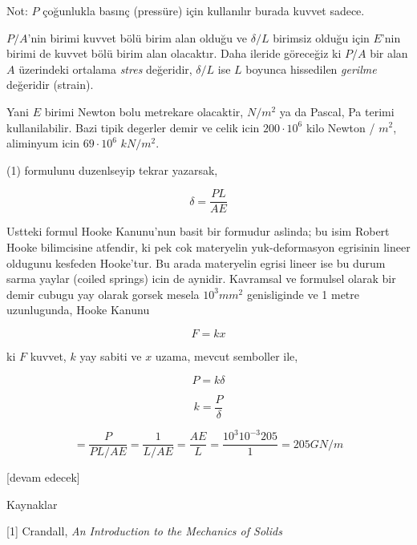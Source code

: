 \documentclass[12pt,fleqn]{article}\usepackage{../../common}
\begin{document}
Not: $P$ çoğunlukla basınç (pressüre) için kullanılır burada kuvvet sadece. 

$P/A$'nin birimi kuvvet bölü birim alan olduğu ve $\delta / L$ birimsiz olduğu
için $E$'nin birimi de kuvvet bölü birim alan olacaktır. Daha ileride göreceğiz
ki $P/A$ bir alan $A$ üzerindeki ortalama {\em stres} değeridir, $\delta / L$
ise $L$ boyunca hissedilen {\em gerilme} değeridir (strain).

Yani $E$ birimi Newton bolu metrekare olacaktir, $N/m^2$ ya da Pascal, Pa
terimi kullanilabilir. Bazi tipik degerler demir ve celik icin $200\cdot 10^6$
kilo Newton / $m^2$, aliminyum icin $69 \cdot 10^6$ $kN / m^2$.

(1) formulunu duzenlseyip tekrar yazarsak, 

$$
\delta = \frac{PL}{AE}
$$

Ustteki formul Hooke Kanunu'nun basit bir formudur aslinda; bu isim Robert Hooke
bilimcisine atfendir, ki pek cok materyelin yuk-deformasyon egrisinin lineer
oldugunu kesfeden Hooke'tur. Bu arada materyelin egrisi lineer ise bu durum
sarma yaylar (coiled springs) icin de aynidir. Kavramsal ve formulsel olarak
bir demir cubugu yay olarak gorsek mesela $10^3 mm^2$ genisliginde ve
1 metre uzunlugunda, Hooke Kanunu

$$
F = k x
$$

ki $F$ kuvvet, $k$ yay sabiti ve $x$ uzama, mevcut semboller ile,

$$
P = k \delta
$$

$$
k = \frac{P}{\delta}
$$

$$
= \frac{P}{PL / AE} = \frac{1}{L / AE} = \frac{AE}{L} =
\frac{10^3 10^{-3} 205}{1} =
205 GN/m
$$






[devam edecek]

Kaynaklar

[1] Crandall, {\em An Introduction to the Mechanics of Solids}
\end{document}
